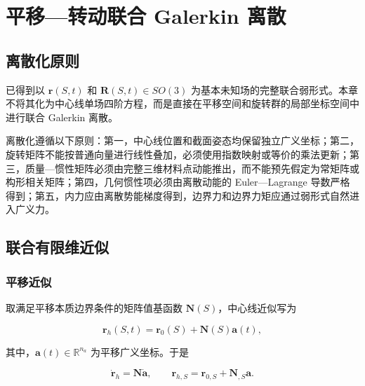 \section{平移---转动联合 Galerkin 离散}\label{sec:galerkin-discretization}

\subsection{离散化原则}\label{sec:galerkin-2-1}

已得到以 \(\mathbf{r}(S,t)\) 和 \(\mathbf{R}(S,t) \in SO(3)\) 为基本未知场的完整联合弱形式。本章不将其化为中心线单场四阶方程，而是直接在平移空间和旋转群的局部坐标空间中进行联合 Galerkin 离散。

离散化遵循以下原则：第一，中心线位置和截面姿态均保留独立广义坐标；第二，旋转矩阵不能按普通向量进行线性叠加，必须使用指数映射或等价的乘法更新；第三，质量---惯性矩阵必须由完整三维材料点动能推出，而不能预先假定为常矩阵或构形相关矩阵；第四，几何惯性项必须由离散动能的 Euler---Lagrange 导数严格得到；第五，内力应由离散势能梯度得到，边界力和边界力矩应通过弱形式自然进入广义力。\cite{Sola2018MicroLie,MarsdenRatiu1999MechanicsSymmetry,HairerLubichWanner2006GNI}

\subsection{联合有限维近似}\label{sec:galerkin-2-2}

\subsubsection{平移近似}\label{sec:galerkin-2-2-1}

取满足平移本质边界条件的矩阵值基函数 \(\mathbf{N}(S)\)，中心线近似写为

\begin{equation}
\label{eq:galerkin-2-1}
\mathbf{r}_{h}(S,t) = \mathbf{r}_{0}(S) + \mathbf{N}(S)\mathbf{a}(t),
\end{equation}

其中，\(\mathbf{a}(t) \in \mathbb{R}^{n_{a}}\) 为平移广义坐标。于是

\begin{equation}
\label{eq:galerkin-2-2}
{\dot{\mathbf{r}}}_{h} = \mathbf{N}\dot{\mathbf{a}},\quad\quad\mathbf{r}_{h,S} = \mathbf{r}_{0,S} + \mathbf{N}_{,S}\mathbf{a}.
\end{equation}

